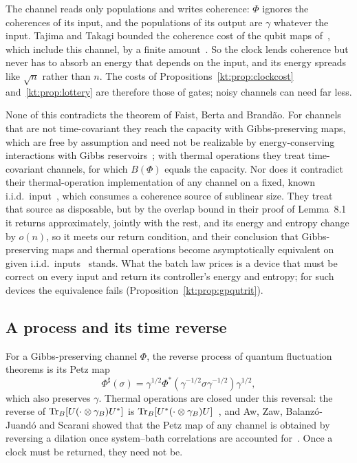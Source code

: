 The channel reads only populations and writes coherence: $\Phi$ ignores the coherences of its input, and the populations of its output are $\gamma$ whatever the input. Tajima and Takagi bounded the coherence cost of the qubit maps of~\cite{FOR15}, which include this channel, by a finite amount~\cite[Suppl.\ Sec.~IV]{TajimaTakagi25}. So the clock lends coherence but never has to absorb an energy that depends on the input, and its energy spreads like $\sqrt n$ rather than $n$. The costs of Propositions~\ref{kt:prop:clockcost} and~\ref{kt:prop:lottery} are therefore those of gates; noisy channels can need far less.

None of this contradicts the theorem of Faist, Berta and Brand\~ao. For channels that are not time-covariant they reach the capacity with Gibbs-preserving maps, which are free by assumption and need not be realizable by energy-conserving interactions with Gibbs reservoirs~\cite{FBB19,FOR15,TajimaTakagi25}; with thermal operations they treat time-covariant channels, for which $B(\Phi)$ equals the capacity. Nor does it contradict their thermal-operation implementation of any channel on a fixed, known i.i.d.\ input~\cite[Prop.~8.3]{FBB21}, which consumes a coherence source of sublinear size. They treat that source as disposable, but by the overlap bound in their proof of Lemma~8.1~\cite[Eq.~(8.25)]{FBB21} it returns approximately, jointly with the rest, and its energy and entropy change by $o(n)$, so it meets our return condition, and their conclusion that Gibbs-preserving maps and thermal operations become asymptotically equivalent on given i.i.d.\ inputs~\cite{FBB19} stands. What the batch law prices is a device that must be correct on every input and return its controller's energy and entropy; for such devices the equivalence fails (Proposition~\ref{kt:prop:gpqutrit}).

\subsection{A process and its time reverse}\label{kt:sec:arrow}

For a Gibbs-preserving channel $\Phi$, the reverse process of quantum fluctuation theorems is its Petz map~\cite{Crooks08,KwonKim19}
\[
\Phi^\sharp(\sigma)=\gamma^{1/2}\Phi^*(\gamma^{-1/2}\sigma\gamma^{-1/2})\gamma^{1/2},
\]
which also preserves $\gamma$. Thermal operations are closed under this reversal: the reverse of $\operatorname{Tr}_B[U(\cdot\otimes\gamma_B)U^*]$ is $\operatorname{Tr}_B[U^*(\cdot\otimes\gamma_B)U]$~\cite{Crooks08,AWWW18}, and Aw, Zaw, Balanz\'o-Juand\'o and Scarani showed that the Petz map of any channel is obtained by reversing a dilation once system--bath correlations are accounted for~\cite{AwZawBalanzoScarani24}. Once a clock must be returned, they need not be.

